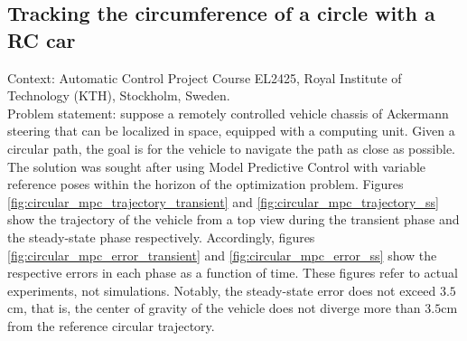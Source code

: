 \subsection{Tracking the circumference of a circle with a RC car}

Context: Automatic Control Project Course EL2425, Royal Institute of
Technology (KTH), Stockholm, Sweden.\\

Problem statement: suppose a remotely controlled vehicle chassis of Ackermann
steering that can be localized in space, equipped with a computing unit. Given a
circular path, the goal is for the vehicle to navigate the path as close as
possible. The solution was sought after using Model Predictive Control with
variable reference poses within the horizon of the optimization problem.
Figures \ref{fig:circular_mpc_trajectory_transient} and
\ref{fig:circular_mpc_trajectory_ss} show the trajectory of the vehicle from
a top view during the transient phase and the steady-state phase respectively.
Accordingly, figures \ref{fig:circular_mpc_error_transient} and
\ref{fig:circular_mpc_error_ss} show the respective errors in each phase as
a function of time. These figures refer to actual experiments, not simulations.
Notably, the steady-state error does not exceed $3.5$cm, that is, the center
of gravity of the vehicle does not diverge more than $3.5$cm from the reference
circular trajectory.


\noindent{}

